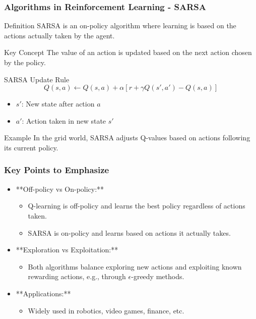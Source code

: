 \documentclass[aspectratio=169]{beamer}
\begin{document}
\begin{frame}[fragile]
    \frametitle{Algorithms in Reinforcement Learning - SARSA}
    \begin{block}{Definition}
        SARSA is an on-policy algorithm where learning is based on the actions actually taken by the agent.
    \end{block}

    \begin{block}{Key Concept}
        The value of an action is updated based on the next action chosen by the policy.
    \end{block}
    
    \begin{block}{SARSA Update Rule}
        \begin{equation}
            Q(s, a) \leftarrow Q(s, a) + \alpha \left[ r + \gamma Q(s', a') - Q(s, a) \right]
        \end{equation}
        \begin{itemize}
            \item \( s' \): New state after action \( a \)
            \item \( a' \): Action taken in new state \( s' \)
        \end{itemize}
    \end{block}
    
    \begin{block}{Example}
        In the grid world, SARSA adjusts Q-values based on actions following its current policy.
    \end{block}
\end{frame}

\begin{frame}[fragile]
    \frametitle{Key Points to Emphasize}
    \begin{itemize}
        \item **Off-policy vs On-policy:** 
        \begin{itemize}
            \item Q-learning is off-policy and learns the best policy regardless of actions taken.
            \item SARSA is on-policy and learns based on actions it actually takes.
        \end{itemize}
        \item **Exploration vs Exploitation:**
        \begin{itemize}
            \item Both algorithms balance exploring new actions and exploiting known rewarding actions, e.g., through \( \epsilon \)-greedy methods.
        \end{itemize}
        \item **Applications:** 
        \begin{itemize}
            \item Widely used in robotics, video games, finance, etc.
        \end{itemize}
    \end{itemize}
\end{frame}
\end{document}
